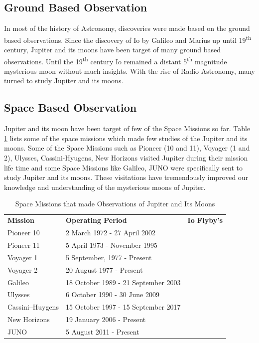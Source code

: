 \documentclass[a4paper,11pt,oneside]{article}
\begin{document}
\subsection{Ground Based Observation}
In most of the history of Astronomy, discoveries were made based on the ground based observations. Since the discovery of Io by Galileo and Marius up until 19\textsuperscript{th} century, Jupiter and its moons have been target of many ground based observations. Until the 19\textsuperscript{th} century Io remained a distant 5\textsuperscript{th} magnitude mysterious moon without much insights. With the rise of Radio Astronomy, many turned to study Jupiter and its moons.

\subsection{Space Based Observation}
Jupiter and its moon have been target of few of the Space Missions so far. Table \ref{table:3} lists some of the space missions which made few studies of the Jupiter and its moons. Some of the Space Missions such as Pioneer (10 and 11), Voyager (1 and 2), Ulysses, Cassini-Hyugens, New Horizons visited Jupiter during their mission life time and some Space Missions like Galileo, JUNO were specifically sent to study Jupiter and its moons. These visitations have tremendously improved our knowledge and understanding of the mysterious moons of Jupiter.

\begin{table}[ht]
\begin{tabular}{lll}
 \textbf{Mission} & \textbf{Operating Period}  & \textbf{Io Flyby's}  \\
 Pioneer 10 & 2 March 1972 - 27 April 2002 &  \\
 Pioneer 11 & 5 April 1973 - November 1995 &  \\
 Voyager 1 & 5 September, 1977 - Present &  \\
 Voyager 2 & 20 August 1977 - Present &  \\
 Galileo & 18 October 1989 - 21 September 2003 &  \\
 Ulysses & 6 October 1990 - 30 June 2009&  \\
 Cassini–Huygens & 15 October 1997 - 15 September 2017 & \\
 New Horizons & 19 January 2006 - Present &  \\
 JUNO & 5 August 2011 - Present & 
\end{tabular}
\caption{Space Missions that made Observations of Jupiter and Its Moons}
\label{table:3}
\end{table}
\end{document}
